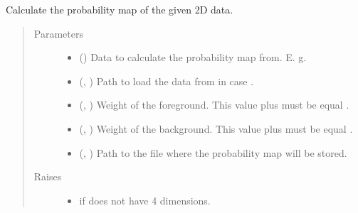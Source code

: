\documentclass[letterpaper,10pt,english]{sphinxmanual}
\begin{document}
\begin{fulllineitems}
\label{\detokenize{utils/util:utils.util.calculate_2D_volume_prob_map}}
Calculate the probability map of the given 2D data.
\begin{quote}\begin{description}
\item[{Parameters}] \leavevmode\begin{itemize}
\item {} 
 () \textendash{} Data to calculate the probability map from. E. g. 

\item {} 
 (, ) \textendash{} Path to load the data from in case .

\item {} 
 (, ) \textendash{} Weight of the foreground. This value plus  must be equal .

\item {} 
 (, ) \textendash{} Weight of the background. This value plus  must be equal .

\item {} 
 (, ) \textendash{} Path to the file where the probability map will be stored.

\end{itemize}

\item[{Raises}] \leavevmode\begin{itemize}
\item {} 
 \textendash{} if  does not have 4 dimensions.


\end{itemize}
\end{description}
\end{quote}
\end{fulllineitems}
\end{document}

